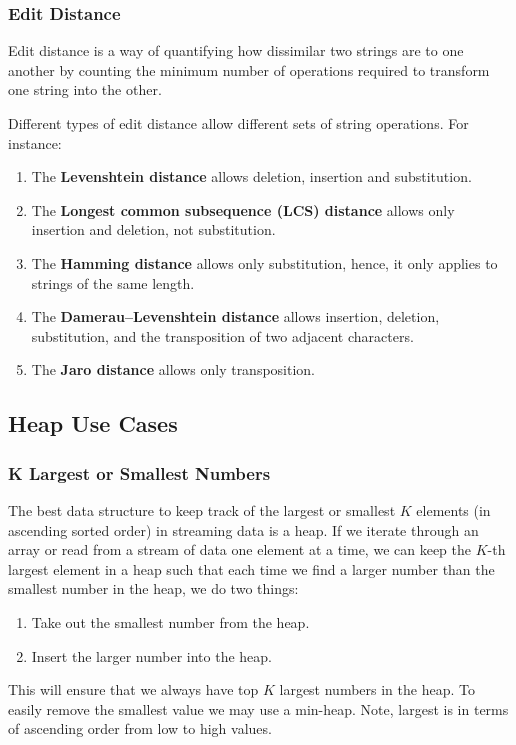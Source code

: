 \documentclass{article}
\begin{document}
    \subsubsection{Edit Distance}
    Edit distance is a way of quantifying how dissimilar two strings are to one another by counting the minimum number of operations required to transform one string into the other. 

    Different types of edit distance allow different sets of string operations. For instance:
    \begin{enumerate}
        \item The \textbf{Levenshtein distance} allows deletion, insertion and substitution.
        \item The \textbf{Longest common subsequence (LCS) distance} allows only insertion and deletion, not substitution.
        \item The \textbf{Hamming distance} allows only substitution, hence, it only applies to strings of the same length.
        \item The \textbf{Damerau–Levenshtein distance} allows insertion, deletion, substitution, and the transposition of two adjacent characters.
        \item The \textbf{Jaro distance} allows only transposition.
    \end{enumerate}
    
    \subsection{Heap Use Cases}
    \subsubsection{K Largest or Smallest Numbers}
    The best data structure to keep track of the largest or smallest $K$ elements (in ascending sorted order) in streaming data is a heap. If we iterate through an array or read from a stream of data one element at a time, we can keep the $K$-th largest element in a heap such that each time we find a larger number than the smallest number in the heap, we do two things:
    \begin{enumerate}
        \item Take out the smallest number from the heap.
        \item Insert the larger number into the heap.
    \end{enumerate}
    This will ensure that we always have top $K$ largest numbers in the heap. To easily remove the smallest value we may use a min-heap. Note, largest is in terms of ascending order from low to high values. 
    
\end{document}
